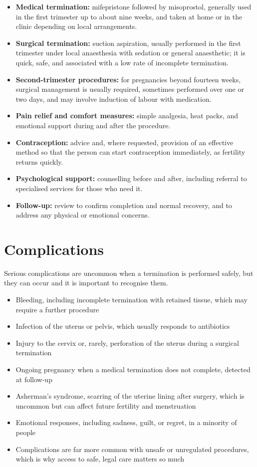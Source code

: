 \begin{itemize}
    \item \textbf{Medical termination:} mifepristone followed by misoprostol, generally used in the first trimester up to about nine weeks, and taken at home or in the clinic depending on local arrangements.
    \item \textbf{Surgical termination:} suction aspiration, usually performed in the first trimester under local anaesthesia with sedation or general anaesthetic; it is quick, safe, and associated with a low rate of incomplete termination.
    \item \textbf{Second-trimester procedures:} for pregnancies beyond fourteen weeks, surgical management is usually required, sometimes performed over one or two days, and may involve induction of labour with medication.
    \item \textbf{Pain relief and comfort measures:} simple analgesia, heat packs, and emotional support during and after the procedure.
    \item \textbf{Contraception:} advice and, where requested, provision of an effective method so that the person can start contraception immediately, as fertility returns quickly.
    \item \textbf{Psychological support:} counselling before and after, including referral to specialised services for those who need it.
    \item \textbf{Follow-up:} review to confirm completion and normal recovery, and to address any physical or emotional concerns.
\end{itemize}

\section*{Complications}
Serious complications are uncommon when a termination is performed safely, but they can occur and it is important to recognise them.

\begin{itemize}
    \item Bleeding, including incomplete termination with retained tissue, which may require a further procedure
    \item Infection of the uterus or pelvis, which usually responds to antibiotics
    \item Injury to the cervix or, rarely, perforation of the uterus during a surgical termination
    \item Ongoing pregnancy when a medical termination does not complete, detected at follow-up
    \item Asherman's syndrome, scarring of the uterine lining after surgery, which is uncommon but can affect future fertility and menstruation
    \item Emotional responses, including sadness, guilt, or regret, in a minority of people
    \item Complications are far more common with unsafe or unregulated procedures, which is why access to safe, legal care matters so much
\end{itemize}

